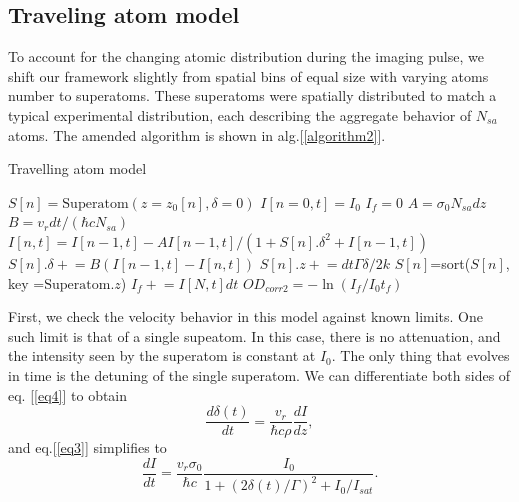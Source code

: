 \documentclass[12pt]{iopart}
\begin{document}
\subsection{Traveling atom model}
To account for the changing atomic distribution during the imaging pulse, we shift our framework slightly from spatial bins of equal size with varying atoms number to superatoms. These superatoms were spatially distributed to match a typical experimental distribution, each describing the aggregate behavior of $N_{sa}$ atoms. The amended algorithm is shown in alg.[\ref{algorithm2}]. 
\begin{algorithm}
\caption{Travelling atom model}
\label{algorithm2}
\begin{algorithmic}
\STATE $S[n]=\mathrm{Superatom}(z=z_0[n], \delta=0)$  
\STATE $I[n=0,t]=I_0$  
\STATE $I_f=0$
 \STATE $A=\sigma_0 N_{sa} dz$
 \STATE $B=v_r dt/(\hbar c  N_{sa})$ 
\STATE $I[n,t]=I[n-1,t] - A I[n-1,t]/(1+S[n].\delta^2+I[n-1,t])$  
\STATE $S[n].\delta\mathrel{+}=B\left(I[n-1,t]-I[n,t]\right)$   
\STATE $S[n].z\mathrel{+}=dt\Gamma\delta/2k$ 
\ENDFOR 
\STATE $S[n]$=sort($S[n]$, key =$\mathrm{ Superatom}.z$) 
\STATE $I_f  \mathrel{+}= I[N,t]dt$
\ENDFOR
\STATE $OD_{corr2}=-\ln{(I_f/I_0t_f)}$
\end{algorithmic}
\end{algorithm}
\par First, we check the velocity behavior in this model against known limits. One such limit is that of a single supeatom. In this case, there is no attenuation, and the intensity seen by the superatom is constant at $I_0$. The only thing that evolves in time is the detuning of the single superatom. We can differentiate both sides of eq. [\ref{eq4}] to obtain
\begin{equation}
\frac{d\delta\left(t\right)}{dt}=\frac{v_r}{\hbar c \rho}\frac{dI}{dz},
\label{eq9}
\end{equation} 
and eq.[\ref{eq3}] simplifies to
\begin{equation}
\frac{dI}{dt}=\frac{v_r \sigma_0}{\hbar c}\frac{I_0}{1+(2\delta(t)/\Gamma)^2 +I_0/I_{sat}}.
\label{oneAtom}
\end{equation}
\end{document}
